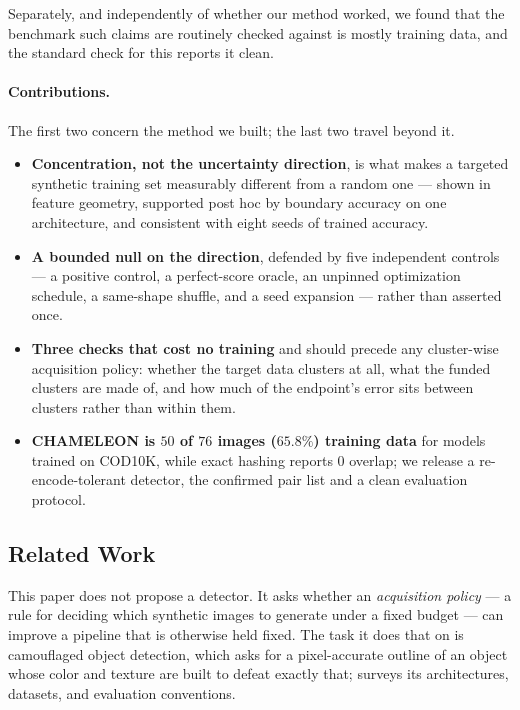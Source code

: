 \documentclass{article}
\begin{document}
Separately, and independently of whether our method worked, we found that the benchmark such claims
are routinely checked against is mostly training data, and the standard check for this reports it clean.

\paragraph{Contributions.} The first two concern the method we built; the last two travel beyond it.

\begin{itemize}
\itemsep0.04em
\item \textbf{Concentration, not the uncertainty direction}, is what makes a targeted synthetic
training set measurably different from a random one --- shown in feature geometry, supported post hoc
by boundary accuracy on one architecture, and consistent with eight seeds of trained accuracy.
\item \textbf{A bounded null on the direction}, defended by five independent controls --- a positive
control, a perfect-score oracle, an unpinned optimization schedule, a same-shape shuffle, and a seed
expansion --- rather than asserted once.
\item \textbf{Three checks that cost no training} and should precede any cluster-wise acquisition
policy: whether the target data clusters at all, what the funded clusters are made of, and how much of the endpoint's error sits between clusters rather than within them.
\item \textbf{CHAMELEON is $50$ of $76$ images ($65.8\%$) training data} for models trained on
COD10K, while exact hashing reports $0$ overlap; we release a re-encode-tolerant detector, the
confirmed pair list and a clean evaluation protocol.
\end{itemize}

\subsection{Related Work}
\label{sec:related}
This paper does not propose a detector. It asks whether an \emph{acquisition policy} --- a rule for
deciding which synthetic images to generate under a fixed budget --- can improve a pipeline that is
otherwise held fixed. The task it does that on is camouflaged object detection, which asks for a
pixel-accurate outline of an object whose color and texture are built to defeat exactly that;
\citet{fan2023advances} surveys its architectures, datasets, and evaluation conventions.
\end{document}
